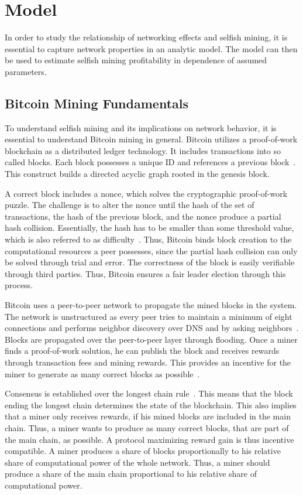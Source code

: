 \chapter{Model}\label{chap:model}
In order to study the relationship of networking effects and selfish mining, it is essential to capture network properties in an analytic model. The model can then be used to estimate selfish mining profitability in dependence of assumed parameters.
\section{Bitcoin Mining Fundamentals}
To understand selfish mining and its implications on network behavior, it is essential to understand Bitcoin mining in general.
Bitcoin utilizes a proof-of-work blockchain as a distributed ledger technology.
It includes transactions into so called blocks. Each block possesses a unique ID and references a previous block~\cite{tschorsch}. This construct builds a directed acyclic graph rooted in the genesis block.

A correct block includes a nonce, which solves the cryptographic proof-of-work puzzle. The challenge is to alter the nonce until the hash of the set of transactions, the hash of the previous block, and the nonce produce a partial hash collision. Essentially, the hash has to be smaller than some threshold value, which is also referred to as difficulty~\cite{tschorsch}.
Thus, Bitcoin binds block creation to the computational resources a peer possesses, since the partial hash collision can only be solved through trial and error. The correctness of the block is easily verifiable through third parties. Thus, Bitcoin ensures a fair leader election through this process.

Bitcoin uses a peer-to-peer network to propagate the mined blocks in the system. The network is unstructured as every peer tries to maintain a minimum of eight connections and performs neighbor discovery over DNS and by asking neighbors~\cite{tschorsch}. Blocks are propagated over the peer-to-peer layer through flooding.
Once a miner finds a proof-of-work solution, he can publish the block and receives rewards through transaction fees and mining rewards. This provides an incentive for the miner to generate as many correct blocks as possible~\cite{1}.

Consensus is established over the longest chain rule~\cite{1}. This means that the block ending the longest chain determines the state of the blockchain. This also implies that a miner only receives rewards, if his mined blocks are included in the main chain. Thus, a miner wants to produce as many correct blocks, that are part of the main chain, as possible. A protocol maximizing reward gain is thus incentive compatible.
A miner produces a share of blocks proportionally to his relative share of computational power of the whole network. Thus, a miner should produce a share of the main chain proportional to his relative share of computational power.

